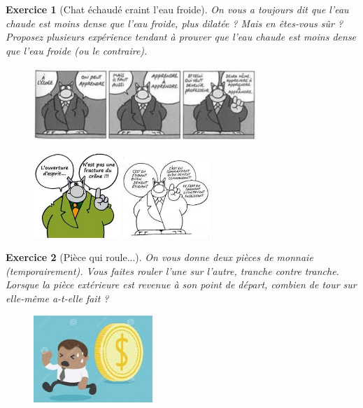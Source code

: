 \documentclass[12pt]{article}
\theoremstyle{break}
\newtheorem{exo}{Exercice}
\begin{document}
\begin{exo}[Chat échaudé craint l'eau froide]
On vous a toujours dit que l'eau chaude est moins dense que l'eau froide, plus dilatée ? Mais en êtes-vous sûr ? Proposez plusieurs expérience tendant à prouver que l'eau chaude est moins dense que l'eau froide (ou le contraire).

\begin{figure}[h!]
	\centering
    \includegraphics[width=0.75\textwidth]{images/LeChat1.jpg}
\end{figure}

\begin{figure}[h!]
	\centering
    \includegraphics[width=0.29\textwidth]{images/LeChat2.jpg}
    \includegraphics[width=0.29\textwidth]{images/LeChat3.jpg}
\end{figure}
\end{exo}


\begin{exo}[Pièce qui roule...]
On vous donne deux pièces de monnaie (temporairement). Vous faites rouler l'une sur l'autre, tranche contre tranche. Lorsque la pièce extérieure est revenue à son point de départ, combien de tour sur elle-même a-t-elle fait ?

\begin{figure}[h!]
	\centering
    \includegraphics[width=0.4\textwidth]{images/PieceDeMonnaie.jpg}
\end{figure}
\end{exo}
\end{document}
